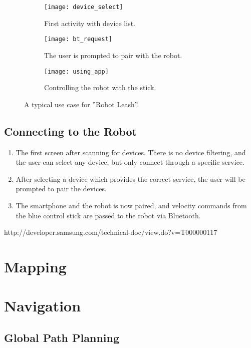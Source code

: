 \begin{figure}
	\centering
	\begin{subfigure}[b]{0.30\textwidth}
		\texttt{[image: device\_select]}
		\caption{First activity with device list.}
		\label{fig:device_select}
	\end{subfigure}
		\begin{subfigure}[b]{0.30\textwidth}
			\texttt{[image: bt\_request]}
			\caption{The user is prompted to pair with the robot.}
			\label{fig:bt_request}
		\end{subfigure}
	\begin{subfigure}[b]{0.30\textwidth}
		\texttt{[image: using\_app]}
		\caption{Controlling the robot with the stick.}
		\label{fig:using_app}
	\end{subfigure}
	\caption{\label{fig:app_screens}A typical use case for ''Robot Leash''.}
\end{figure}

\subsection{Connecting to the Robot}

\begin{enumerate}
	\item The first screen after scanning for devices. There is no device filtering, and the user can select any device, but only connect through a specific service.
	\item After selecting a device which provides the correct service, the user will be prompted to pair the devices.
	\item The smartphone and the robot is now paired, and velocity commands from the blue control stick are passed to the robot via Bluetooth.
\end{enumerate}

http://developer.samsung.com/technical-doc/view.do?v=T000000117

\section{Mapping}

\section{Navigation}

\subsection{Global Path Planning}


